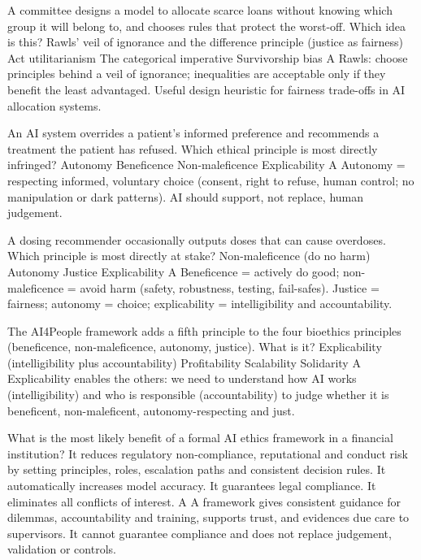 {A committee designs a model to allocate scarce loans without knowing which group it will belong to, and chooses rules that protect the worst-off. Which idea is this?}
{Rawls' veil of ignorance and the difference principle (justice as fairness)}
{Act utilitarianism}
{The categorical imperative}
{Survivorship bias}
{A}
{Rawls: choose principles behind a veil of ignorance; inequalities are acceptable only if they benefit the least advantaged. Useful design heuristic for fairness trade-offs in AI allocation systems.}

{An AI system overrides a patient's informed preference and recommends a treatment the patient has refused. Which ethical principle is most directly infringed?}
{Autonomy}
{Beneficence}
{Non-maleficence}
{Explicability}
{A}
{Autonomy = respecting informed, voluntary choice (consent, right to refuse, human control; no manipulation or dark patterns). AI should support, not replace, human judgement.}

{A dosing recommender occasionally outputs doses that can cause overdoses. Which principle is most directly at stake?}
{Non-maleficence (do no harm)}
{Autonomy}
{Justice}
{Explicability}
{A}
{Beneficence = actively do good; non-maleficence = avoid harm (safety, robustness, testing, fail-safes). Justice = fairness; autonomy = choice; explicability = intelligibility and accountability.}

{The AI4People framework adds a fifth principle to the four bioethics principles (beneficence, non-maleficence, autonomy, justice). What is it?}
{Explicability (intelligibility plus accountability)}
{Profitability}
{Scalability}
{Solidarity}
{A}
{Explicability enables the others: we need to understand how AI works (intelligibility) and who is responsible (accountability) to judge whether it is beneficent, non-maleficent, autonomy-respecting and just.}

{What is the most likely benefit of a formal AI ethics framework in a financial institution?}
{It reduces regulatory non-compliance, reputational and conduct risk by setting principles, roles, escalation paths and consistent decision rules.}
{It automatically increases model accuracy.}
{It guarantees legal compliance.}
{It eliminates all conflicts of interest.}
{A}
{A framework gives consistent guidance for dilemmas, accountability and training, supports trust, and evidences due care to supervisors. It cannot guarantee compliance and does not replace judgement, validation or controls.}

